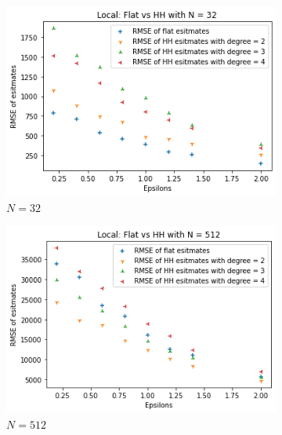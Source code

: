 \documentclass[11pt]{article}
\theoremstyle{definition}
\begin{document}
\begin{figure}[H]
\centering
\begin{subfigure}{.3\textwidth}
  \centering
  \includegraphics[width=\linewidth]{figures/local_flat_hh/flat_beat_hh_N=32.png}
  \caption{$N=32$}
  \label{fig:loc_flat_hh1}
\end{subfigure}%
\begin{subfigure}{.3\textwidth}
  \centering
  \includegraphics[width=\linewidth]{figures/local_flat_hh/flat_beat_hh_N=512.png}
  \caption{$N=512$}
  \label{fig:loc_flat_hh2}
\end{subfigure}%
\begin{subfigure}{.3\textwidth}
  \centering

\end{subfigure}
\end{figure}
\end{document}
